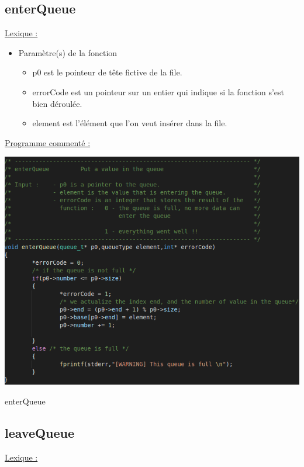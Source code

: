 \documentclass[a4paper]{article}
\begin{document}
\subsection{enterQueue}
\underline{Lexique :}

\begin{itemize}

\item Paramètre(s) de la fonction  

\begin{itemize}

\item p0 est le pointeur de tête fictive de la file.

\item errorCode est un pointeur sur un entier qui indique si la fonction s'est bien déroulée.

\item element est l'élément que l'on veut insérer dans la file.

\end{itemize}
\end{itemize}
\underline{Programme commenté :}
\begin{center}
\includegraphics[scale=0.4]{enterQueue.png}

enterQueue
\end{center}
\subsection{leaveQueue}
\underline{Lexique :}
\end{document}
